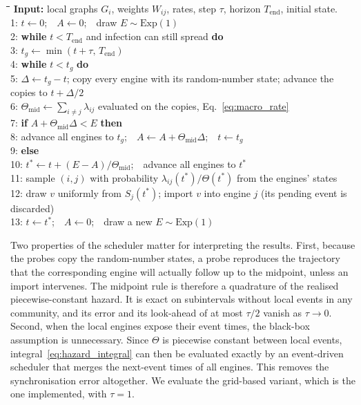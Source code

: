 \documentclass[a4paper,fleqn]{cas-sc}
\newcommand{\Exp}{\mathrm{Exp}}
\begin{document}
\begin{algorithm}[tbp]
\caption{Grid-synchronised two-scale simulation of one realisation.}
\label{alg:scheduler}
\small
\begin{tabbing}
\hspace*{1.6em}\=\hspace*{1.4em}\=\hspace*{1.4em}\=\hspace*{1.4em}\=\kill
\textbf{Input:} local graphs $G_i$, weights $W_{ij}$, rates, step $\tau$, horizon $T_{\mathrm{end}}$, initial state.\\[2pt]
1:\> $t\gets 0$;\ \ $A\gets 0$;\ \ draw $E\sim\Exp(1)$\\
2:\> \textbf{while} $t<T_{\mathrm{end}}$ and infection can still spread \textbf{do}\\
3:\>\> $t_g\gets\min(t+\tau,\,T_{\mathrm{end}})$\\
4:\>\> \textbf{while} $t<t_g$ \textbf{do}\\
5:\>\>\> $\Delta\gets t_g-t$; copy every engine with its random-number state; advance the copies to $t+\Delta/2$\\
6:\>\>\> $\Theta_{\mathrm{mid}}\gets\sum_{i\neq j}\lambda_{ij}$ evaluated on the copies, Eq.~\eqref{eq:macro_rate}\\
7:\>\>\> \textbf{if} $A+\Theta_{\mathrm{mid}}\Delta<E$ \textbf{then} \\
8:\>\>\>\> advance all engines to $t_g$;\ \ $A\gets A+\Theta_{\mathrm{mid}}\Delta$;\ \ $t\gets t_g$\\
9:\>\>\> \textbf{else}\\
10:\>\>\>\> $t^\ast\gets t+(E-A)/\Theta_{\mathrm{mid}}$;\ \ advance all engines to $t^\ast$\\
11:\>\>\>\> sample $(i,j)$ with probability $\lambda_{ij}(t^\ast)/\Theta(t^\ast)$ from the engines' states\\
12:\>\>\>\> draw $v$ uniformly from $S_j(t^\ast)$; import $v$ into engine $j$ (its pending event is discarded)\\
13:\>\>\>\> $t\gets t^\ast$;\ \ $A\gets 0$;\ \ draw a new $E\sim\Exp(1)$
\end{tabbing}
\end{algorithm}

Two properties of the scheduler matter for interpreting the results. First, because the probes copy the random-number states, a probe reproduces the trajectory that the corresponding engine will actually follow up to the midpoint, unless an import intervenes. The midpoint rule is therefore a quadrature of the realised piecewise-constant hazard. It is exact on subintervals without local events in any community, and its error and its look-ahead of at most $\tau/2$ vanish as $\tau\to0$. Second, when the local engines expose their event times, the black-box assumption is unnecessary. Since $\Theta$ is piecewise constant between local events, integral~\eqref{eq:hazard_integral} can then be evaluated exactly by an event-driven scheduler that merges the next-event times of all engines. This removes the synchronisation error altogether. We evaluate the grid-based variant, which is the one implemented, with $\tau=1$.
\end{document}
